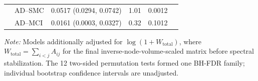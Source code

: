 \documentclass{article}
\providecommand{\DIFaddtex}[1]{{\protect\color{blue}#1}} %
\providecommand{\DIFaddFL}[1]{\DIFadd{#1}} %
\providecommand{\DIFadd}[1]{\texorpdfstring{\DIFaddtex{#1}}{#1}} %
\begin{document}
\begin{table}[!htbp]
\begin{tabular}{lllrrr}
& \DIFaddFL{AD--SMC }& \DIFaddFL{0.0517 (0.0294, 0.0742) }& \DIFaddFL{1.01 }& \DIFaddFL{0.0012}\\
& \DIFaddFL{AD--MCI }& \DIFaddFL{0.0161 (0.0003, 0.0327) }& \DIFaddFL{0.32 }& \DIFaddFL{0.1012}\\
\bottomrule
\end{tabular}
\par\vspace{1mm}
\footnotesize{\textit{Note:} Models additionally adjusted for $\log(1+W_{\mathrm{total}})$, where $W_{\mathrm{total}}=\sum_{i<j}A_{ij}$ for the final inverse-node-volume-scaled matrix before spectral stabilization. The 12 two-sided permutation tests formed one BH-FDR family; individual bootstrap confidence intervals are unadjusted.}
\end{table}
\end{document}
